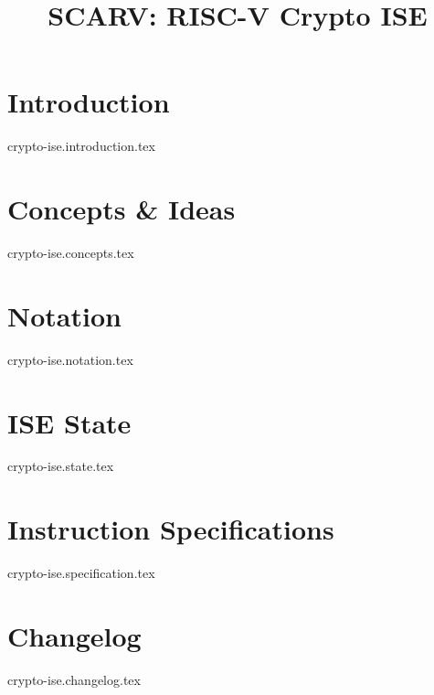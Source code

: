 \documentclass{article}
\title{SCARV: RISC-V Crypto ISE}
\begin{document}
\maketitle
\tableofcontents

\section{Introduction}
{crypto-ise.introduction.tex}

\section{Concepts \& Ideas}
{crypto-ise.concepts.tex}

\section{Notation}
{crypto-ise.notation.tex}

\section{ISE State}
{crypto-ise.state.tex}

\section{Instruction Specifications}
{crypto-ise.specification.tex}


\printbibliography


\section{Changelog}
{crypto-ise.changelog.tex}
\end{document}
